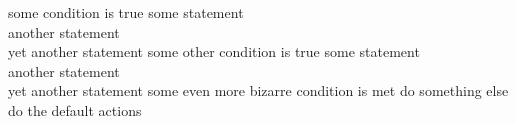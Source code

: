 \documentclass[addpoints]{exam}
\begin{document}
\begin{questions}
\begin{pseudocode}
\IF some condition is true
\THEN
\BEGIN
some statement\\
another statement\\
yet another statement
\END
\ELSEIF some other condition is true
\THEN
\BEGIN
some statement\\
another statement\\
yet another statement
\END
\ELSEIF some even more bizarre condition is met
\THEN
do something else
\ELSE
do the default actions
\end{pseudocode}
\vspace{25mm}
\end{questions}
\end{document}
